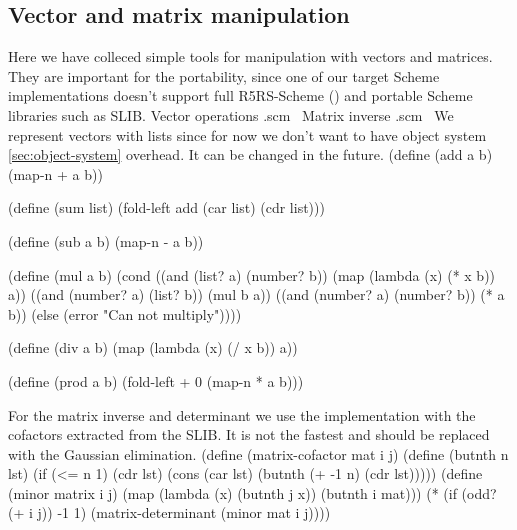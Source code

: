 \documentclass[a4paper,10pt]{article}
\theoremstyle{definition} \newtheorem{Def}{Definition}
\begin{document}
\subsection{Vector and matrix manipulation}
\label{sec:vect-matr-manip}
Here we have colleced simple tools for manipulation with vectors and matrices. They are important for the portability, since one of our target Scheme implementations doesn't support full R5RS-Scheme (\cite{R5RS}) and portable Scheme libraries such as SLIB. 
\nwenddocs{}\endmoddef
\LA{}Vector operations .scm~{\nwtagstyle{}}\RA{}
\LA{}Matrix inverse .scm~{\nwtagstyle{}}\RA{}
\nwendcode{}\nwdocspar
We represent vectors with lists since for now we don't want to have object system \ref{sec:object-system} overhead. It can be changed in the future.
\nwenddocs{}\endmoddef
(define (add a b)
  (map-n + a b))

(define (sum list)
  (fold-left add (car list) (cdr list)))

(define (sub a b)
  (map-n - a b))

(define (mul a b)
  (cond ((and (list? a) (number? b)) (map (lambda (x) (* x b)) a))
        ((and (number? a) (list? b)) (mul b a))
        ((and (number? a) (number? b)) (* a b))
        (else (error "Can not multiply"))))

(define (div a b)
  (map (lambda (x) (/ x b)) a))
  
(define (prod a b)
  (fold-left + 0 (map-n * a b)))
\nwendcode{}\nwdocspar

For the matrix inverse and determinant we use the implementation with the cofactors extracted from the SLIB. It is not the fastest and should be replaced with the Gaussian elimination.
\nwenddocs{}\endmoddef
(define (matrix-cofactor mat i j)
  (define (butnth n lst)
    (if (<= n 1)
        (cdr lst)
        (cons (car lst)
              (butnth (+ -1 n) (cdr lst)))))
  (define (minor matrix i j)
    (map (lambda (x)
           (butnth j x))
         (butnth i mat)))
  (* (if (odd? (+ i j)) -1 1)
     (matrix-determinant (minor mat i j))))
\end{document}
